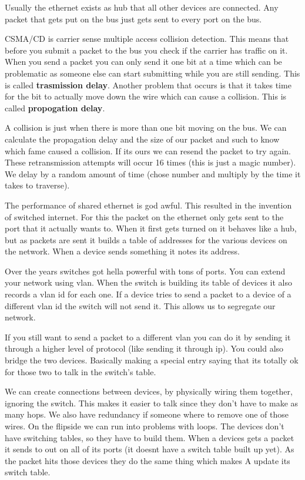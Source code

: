 \documentclass[12pt]{article}
\begin{document}

Usually the ethernet exists as hub that all other devices are connected. Any packet that gets put on the bus just gets sent to every port on the bus.


CSMA/CD is carrier sense multiple access collision detection. This means that before you submit a packet to the bus you check if the carrier has traffic on it. When you send a packet you can only send it one bit at a time which can be problematic as someone else can start submitting while you are still sending. This is called \textbf{trasmission delay}. Another problem that occurs is that it takes time for the bit to actually move down the wire which can cause a collision. This is called \textbf{propogation delay}.


A collision is just when there is more than one bit moving on the bus. We can calculate the propagation delay and the size of our packet and such to know which fame caused a collision. If its ours we can resend the packet to try again. These retransmission attempts will occur 16 times (this is just a magic number). We delay by a random amount of time (chose number and multiply by the time it takes to traverse). 


The performance of shared ethernet is god awful. This resulted in the invention of switched internet. For this the packet on the ethernet only gets sent to the port that it actually wants to. When it first gets turned on it behaves like a hub, but as packets are sent it builds a table of addresses for the various devices on the network. When a device sends something it notes its address.


Over the years switches got hella powerful with tons of ports. You can extend your network using vlan. When the switch is building its table of devices it also records a vlan id for each one. If a device tries to send a packet to a device of a different vlan id the switch will not send it. This allows us to segregate our network. 


If you still want to send a packet to a different vlan you can do it by sending it through a higher level of protocol (like sending it through ip). You could also bridge the two devices. Basically making a special entry saying that its totally ok for those two to talk in the switch's table.



We can create connections between devices, by physically wiring them together, ignoring the switch. This makes it easier to talk since they don't have to make as many hops. We also have redundancy if someone where to remove one of those wires. On the flipside we can run into problems with loops. The devices don't have switching tables, so they have to build them. When a devices gets a packet it sends to out on all of its ports (it doesnt have a switch table built up yet). As the packet hits those devices they do the same thing which makes A update its switch table. 
\end{document}
